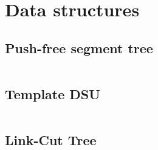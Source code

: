 \section{Data structures}

\subsection{Push-free segment tree}

\inputminted{cpp}{\code/pushfreesegtree_faster.cpp}

\subsection{Template DSU}

\inputminted{cpp}{\code/dsu.cpp}

\subsection{Link-Cut Tree}

\inputminted{cpp}{\code/lct_short.cpp}
